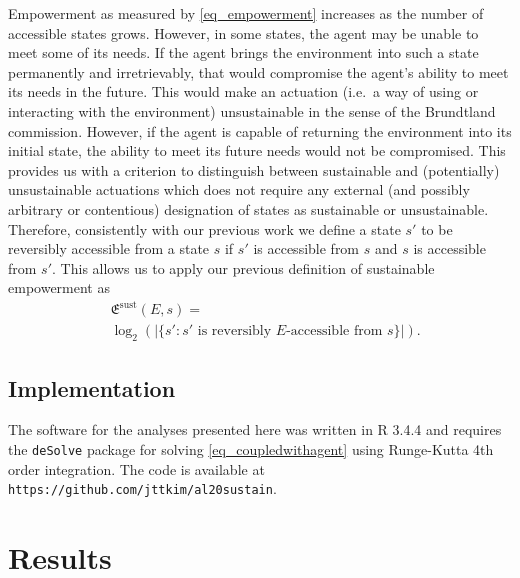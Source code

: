 \documentclass[conference]{IEEEtran}
\newcommand{\empowerment}{\ensuremath{\mathfrak{E}}}
\newcommand{\sustainableempowerment}{\ensuremath{\empowerment^{\mathrm{sust}}}}
\begin{document}
Empowerment as measured by \ref{eq_empowerment} increases as the
number of accessible states grows. However, in some states, the agent
may be unable to meet some of its needs. If the agent brings the
environment into such a state permanently and irretrievably, that
would compromise the agent's ability to meet its needs in the future.
This would make an actuation (i.e.\ a way of using or interacting with
the environment) unsustainable in the sense of the Brundtland
commission. However, if the agent is capable of returning the
environment into its initial state, the ability to meet its future
needs would not be compromised. This provides us with a criterion to
distinguish between sustainable and (potentially) unsustainable
actuations which does not require any external (and possibly arbitrary
or contentious) designation of states as sustainable or unsustainable.
Therefore, consistently with our previous work we define a state $s'$
to be reversibly accessible from a state $s$ if $s'$ is accessible
from $s$ and $s$ is accessible from $s'$. This allows us to apply our
previous definition of sustainable empowerment as
\begin{equation}
  \label{eq_empowerment}
  \begin{aligned}
    & \sustainableempowerment(E, s) = \\
    & \log_2(|\{s': s' \mbox{ is
      reversibly } E\mbox{-accessible from } s\}|).
  \end{aligned}
\end{equation}


\subsection{Implementation}

The software for the analyses presented here was written in R 3.4.4
\cite{RManual2018} and requires the \texttt{deSolve} package for
solving \ref{eq_coupledwithagent} using Runge-Kutta 4th order integration.
The code is available at
\texttt{https://github.com/jttkim/al20sustain}.


\section{Results}
\end{document}
